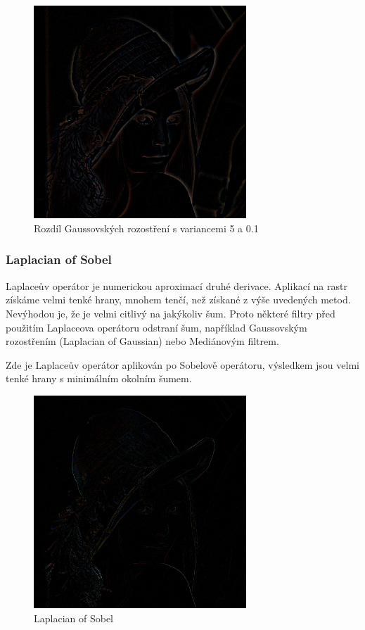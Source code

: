 \documentclass[11pt]{article}
\begin{document}
\begin{figure}[ht!]
\centering
	\includegraphics[width=8cm]{difgaus.png}
	\caption{Rozdíl Gaussovských rozostření s variancemi 5 a 0.1}
\end{figure}
\clearpage

\subsubsection{Laplacian of Sobel}
Laplaceův operátor je numerickou aproximací druhé derivace. Aplikací na rastr
získáme velmi tenké hrany, mnohem tenčí, než získané z výše uvedených metod.
Nevýhodou je, že je velmi citlivý na jakýkoliv šum. Proto některé filtry před
použitím Laplaceova operátoru odstraní šum, například Gaussovským rozostřením
(Laplacian of Gaussian) nebo Mediánovým filtrem.

Zde je Laplaceův operátor aplikován po Sobelově operátoru, výsledkem jsou velmi
tenké hrany s minimálním okolním šumem.

\begin{figure}[ht!]
\centering
	\includegraphics[width=8cm]{los.png}
	\caption{Laplacian of Sobel}
\end{figure}
\clearpage
\end{document}
